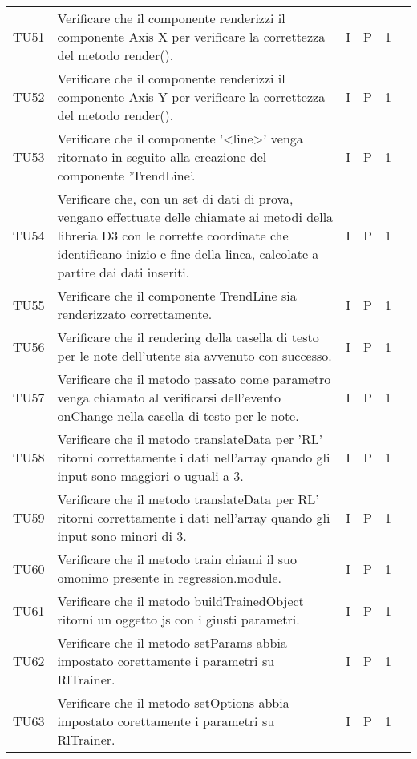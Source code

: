 \begin{longtable} {
		>{}p{12mm}
		>{}p{79.5mm}
		>{}p{9mm}
		>{}p{8mm}
		>{}p{14mm}
		>{}p{0mm}}
	TU51		& Verificare che il componente renderizzi il componente Axis X per verificare la correttezza del metodo render().& I & P & 1 &\TBstrut \\ [2mm]
	TU52		& Verificare che il componente renderizzi il componente Axis Y per verificare la correttezza del metodo render().& I & P & 1 &\TBstrut \\ [2mm]
	TU53	    & Verificare che il componente '<line>' venga ritornato in seguito alla creazione del componente 'TrendLine'. & I & P & 1 &\TBstrut \\ [2mm]
	TU54    	& Verificare che, con un set di dati di prova, vengano effettuate delle chiamate ai metodi della libreria D3 con le corrette coordinate che identificano inizio e fine della linea, calcolate a partire dai dati inseriti. & I & P & 1 &\TBstrut \\ [2mm]
    TU55		& Verificare che il componente TrendLine sia renderizzato correttamente. & I & P & 1 &\TBstrut \\ [2mm]
	TU56    	& Verificare che il rendering della casella di testo per le note dell'utente sia avvenuto con successo. & I & P & 1 &\TBstrut \\ [2mm]
	TU57    	& Verificare che il metodo passato come parametro venga chiamato al verificarsi dell'evento onChange nella casella di testo per le note. & I & P & 1 &\TBstrut \\ [2mm]
	TU58		& Verificare che il metodo translateData per 'RL\glo' ritorni correttamente i dati nell'array quando gli input sono maggiori o uguali a 3.& I & P & 1 &\TBstrut \\ [2mm]
	TU59		& Verificare che il metodo translateData per RL\glo' ritorni correttamente i dati nell'array quando gli input sono minori di 3.& I & P & 1 &\TBstrut \\ [2mm]
	TU60		& Verificare che il metodo train chiami il suo omonimo presente in regression.module. & I & P & 1 &\TBstrut \\ [2mm]
	TU61		& Verificare che il metodo buildTrainedObject ritorni un oggetto js con i giusti parametri. & I & P & 1 &\TBstrut \\ [2mm]
	TU62		& Verificare che il metodo setParams abbia impostato corettamente i parametri su RlTrainer. & I & P & 1 &\TBstrut \\ [2mm]
	TU63		& Verificare che il metodo setOptions abbia impostato corettamente i parametri su RlTrainer. & I & P & 1 &\TBstrut \\ [2mm]

\end{longtable}
